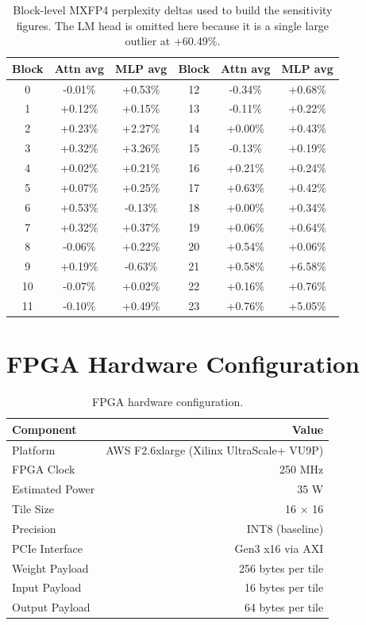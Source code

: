 \documentclass[11pt,a4paper]{article}
\begin{document}
\begin{table}[h!]
\centering
\small
\begin{tabular}{cccccc}
\toprule
\textbf{Block} & \textbf{Attn avg} & \textbf{MLP avg} & \textbf{Block} & \textbf{Attn avg} & \textbf{MLP avg} \\
\midrule
0  & -0.01\% & +0.53\% & 12 & -0.34\% & +0.68\% \\
1  & +0.12\% & +0.15\% & 13 & -0.11\% & +0.22\% \\
2  & +0.23\% & +2.27\% & 14 & +0.00\% & +0.43\% \\
3  & +0.32\% & +3.26\% & 15 & -0.13\% & +0.19\% \\
4  & +0.02\% & +0.21\% & 16 & +0.21\% & +0.24\% \\
5  & +0.07\% & +0.25\% & 17 & +0.63\% & +0.42\% \\
6  & +0.53\% & -0.13\% & 18 & +0.00\% & +0.34\% \\
7  & +0.32\% & +0.37\% & 19 & +0.06\% & +0.64\% \\
8  & -0.06\% & +0.22\% & 20 & +0.54\% & +0.06\% \\
9  & +0.19\% & -0.63\% & 21 & +0.58\% & +6.58\% \\
10 & -0.07\% & +0.02\% & 22 & +0.16\% & +0.76\% \\
11 & -0.10\% & +0.49\% & 23 & +0.76\% & +5.05\% \\
\bottomrule
\end{tabular}
\caption{Block-level MXFP4 perplexity deltas used to build the sensitivity figures. The LM head is omitted here because it is a single large outlier at +60.49\%.}
\end{table}


\section{FPGA Hardware Configuration}
\label{app:fpga-config}

\begin{table}[h!]
\centering
\begin{tabular}{@{}lr@{}}
\toprule
\textbf{Component} & \textbf{Value} \\
\midrule
Platform              & AWS F2.6xlarge (Xilinx UltraScale+ VU9P) \\
FPGA Clock            & 250 MHz \\
Estimated Power       & 35 W \\
Tile Size             & 16 $\times$ 16 \\
Precision             & INT8 (baseline) \\
PCIe Interface        & Gen3 x16 via AXI \\
Weight Payload        & 256 bytes per tile \\
Input Payload         & 16 bytes per tile \\
Output Payload        & 64 bytes per tile \\
\bottomrule
\end{tabular}
\caption{FPGA hardware configuration.}
\label{tab:fpga-config}
\end{table}
\end{document}
